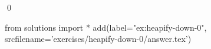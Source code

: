 
\begin{ex} 
  \label{ex:heapify-down-0}
  
  \qed
\end{ex} 
\begin{python0}
from solutions import *
add(label="ex:heapify-down-0",
    srcfilename='exercises/heapify-down-0/answer.tex') 
\end{python0}
